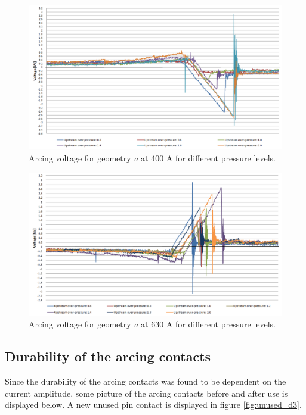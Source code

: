 \documentclass[10pt,a4paper,twoside]{article}
\begin{document}
\begin{figure}[H]
\centering
\includegraphics[scale=0.5]{Bilder/Results/arcingVoltage400Ad4.png}
\caption{Arcing voltage for geometry \textit{a} at 400 A for different pressure levels.} \label{fig:arcingVoltage400A}
\end{figure}

\begin{figure}[H]
\centering
\includegraphics[scale=0.5]{Bilder/Results/arcingVoltage630Ad4.png}
\caption{Arcing voltage for geometry \textit{a} at 630 A for different pressure levels.} \label{fig:arcingVoltage630A}
\end{figure}

\newpage
\subsection{Durability of the arcing contacts} \label{sec:durability}

Since the durability of the arcing contacts was found to be dependent on the current amplitude, some picture of the arcing contacts before and after use is displayed below. A new unused pin contact is displayed in figure \ref{fig:unused_d3}.
\end{document}
